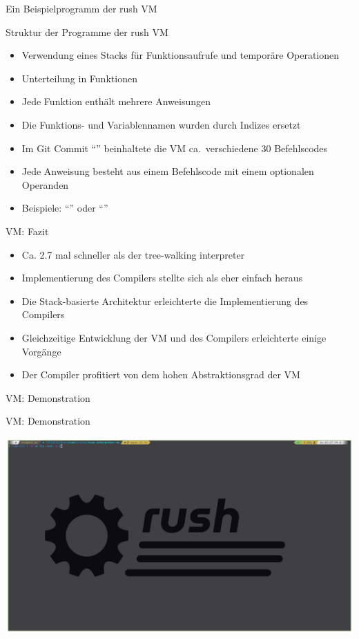 \begin{frame}{Ein Beispielprogramm der rush VM}
	\hspace{0pt} %
	\vfill
	\vfill
\end{frame}

\begin{frame}{Struktur der Programme der rush VM}
	\begin{itemize}
		\item Verwendung eines Stacks für Funktionsaufrufe und temporäre Operationen
		\item Unterteilung in Funktionen
		\item Jede Funktion enthält mehrere Anweisungen
		\item Die Funktions- und Variablennamen wurden durch Indizes ersetzt
		\item Im Git Commit \enquote{\rushCommit{}} beinhaltete die VM ca.\ verschiedene 30 Befehlscodes
		\item Jede Anweisung besteht aus einem Befehlscode mit einem optionalen Operanden
		\item Beispiele: \enquote{} oder \enquote{}
	\end{itemize}
\end{frame}

\begin{frame}{VM: Fazit}
	\begin{itemize}
		\item Ca. 2.7 mal schneller als der tree-walking interpreter
		\item Implementierung des Compilers stellte sich als eher einfach heraus
		\item Die Stack-basierte Architektur erleichterte die Implementierung des Compilers
		\item Gleichzeitige Entwicklung der VM und des Compilers erleichterte einige Vorgänge
		\item Der Compiler profitiert von dem hohen Abstraktionsgrad der VM
	\end{itemize}
\end{frame}

\begin{frame}{VM: Demonstration}
\end{frame}

\begin{frame}{VM: Demonstration}
	\begin{center}
		\href{run:assets/01_rush_presentation_vm.mp4}{
			\includegraphics[width=\textwidth]{assets/01_rush_presentation_vm.png}
		}
	\end{center}
\end{frame}
